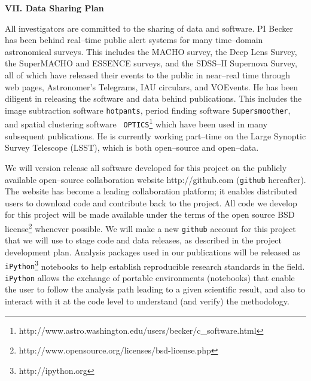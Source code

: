 \bigskip
\centerline{\bf VII. Data Sharing Plan}
\smallskip

All investigators are committed to the sharing of data and software.
PI Becker has been behind real--time public alert systems for many
time--domain astronomical surveys.  This includes the MACHO survey,
the Deep Lens Survey, the SuperMACHO and ESSENCE surveys, and the
SDSS--II Supernova Survey, all of which have released their events to
the public in near--real time through web pages, Astronomer's
Telegrams, IAU circulars, and VOEvents.  He has been diligent in
releasing the software and data behind publications.  This includes
the image subtraction software {\tt hotpants}, period finding software
{\tt Supersmoother}, and spatial clustering software {\tt
  OPTICS}\footnote{http://www.astro.washington.edu/users/becker/c\_software.html}
which have been used in many subsequent publications.  He is currently
working part--time on the Large Synoptic Survey Telescope (LSST),
which is both open--source and open--data.

We will version release all software developed for this project on the
publicly available open--source collaboration website
http://github.com ({\tt github} hereafter).  The website has become a
leading collaboration platform; it enables distributed users to
download code and contribute back to the project.  All code we develop
for this project will be made available under the terms of the open
source BSD
license\footnote{http://www.opensource.org/licenses/bsd-license.php}
whenever possible.  We will make a new {\tt github} account for this
project that we will use to stage code and data releases, as described
in the project development plan.  Analysis packages used in our
publications will be released as {\tt
iPython}\footnote{http://ipython.org} notebooks to help establish
reproducible research standards in the field.  {\tt iPython} allows
the exchange of portable environments (notebooks) that enable the user
to follow the analysis path leading to a given scientific result, and
also to interact with it at the code level to understand (and verify)
the methodology.


